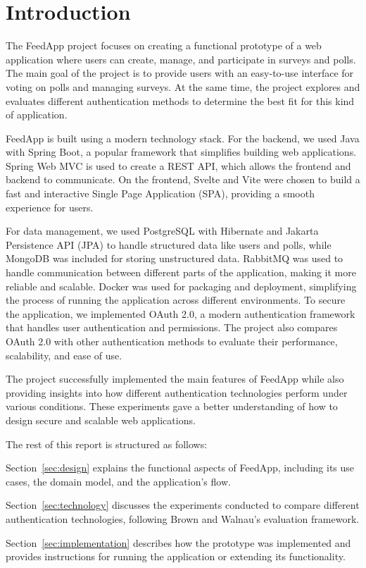 \section{Introduction}
\label{sec:introduction}

The FeedApp project focuses on creating a functional prototype of a web application where users can create, manage, and participate in surveys and polls. The main goal of the project is to provide users with an easy-to-use interface for voting on polls and managing surveys. At the same time, the project explores and evaluates different authentication methods to determine the best fit for this kind of application.

FeedApp is built using a modern technology stack. For the backend, we used Java with Spring Boot, a popular framework that simplifies building web applications. Spring Web MVC is used to create a REST API, which allows the frontend and backend to communicate. On the frontend, Svelte and Vite were chosen to build a fast and interactive Single Page Application (SPA), providing a smooth experience for users.

For data management, we used PostgreSQL with Hibernate and Jakarta Persistence API (JPA) to handle structured data like users and polls, while MongoDB was included for storing unstructured data. RabbitMQ was used to handle communication between different parts of the application, making it more reliable and scalable. Docker was used for packaging and deployment, simplifying the process of running the application across different environments. To secure the application, we implemented OAuth 2.0, a modern authentication framework that handles user authentication and permissions. The project also compares OAuth 2.0 with other authentication methods to evaluate their performance, scalability, and ease of use.

The project successfully implemented the main features of FeedApp while also providing insights into how different authentication technologies perform under various conditions. These experiments gave a better understanding of how to design secure and scalable web applications.

The rest of this report is structured as follows:

Section~\ref{sec:design} explains the functional aspects of FeedApp, including its use cases, the domain model, and the application’s flow.

Section~\ref{sec:technology} discusses the experiments conducted to compare different authentication technologies, following Brown and Walnau’s evaluation framework.

Section~\ref{sec:implementation} describes how the prototype was implemented and provides instructions for running the application or extending its functionality.